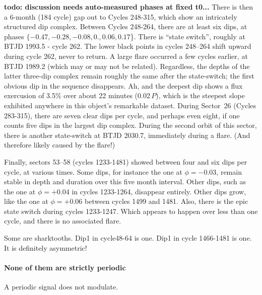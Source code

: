 \documentclass[11pt,twocolumn,tighten]{aastex63}
\begin{document}
{\bf todo: discussion needs auto-measured phases at fixed t0...}
There is then a 6-month (184 cycle) gap out to Cycles 248-315, which
show an intricately structured dip complex.
Between Cycles 248-264, there are at least six dips, at phases $\{
  -0.47, -0.28, -0.08,  0.  ,  0.06,  0.17 $\}.
There is ``state switch'', roughly at BTJD 1993.5 - cycle 262.
The lower black points in cycles 248--264 shift upward during cycle
262, never to return.
A large flare occurred a few cycles earlier, at BTJD 1989.2 (which may
or may not be related).
Regardless, the depths of the latter three-dip complex remain roughly
the same after the state-switch;
the first obvious dip in the sequence disappears.
Ah, and the deepest dip shows a flux exercusion of 3.5\% over about 22 minutes (0.02\,$P$),
which is the steepest slope exhibited anywhere in this object's
remarkable dataset.
During Sector~26 (Cycles 283-315), there are seven clear dips per
cycle, and perhaps even eight, if one counts five dips in the largest
dip complex.
During the second orbit of this sector,
there is another state-switch at BTJD 2030.7, immediately during a
flare.   (And therefore likely caused by the flare!)

Finally, sectors 53--58 (cycles 1233-1481) showed between four and six
dips per cycle, at various times.  
Some dips, for instance the one at $\phi = -0.03$, remain stable in
depth and duration over this five month interval.
Other dips, such as the one at $\phi = +0.04$ in cycles 1233-1264,
disappear entirely.
Other dips grow, like the one at $\phi = +0.06$ between cycles 1499
and 1481.
Also, there is the epic state switch during cycles 1233-1247.
Which appears to happen over less than one cycle, and there is no
associated flare.

Some are sharktooths.
Dip1 in cycle48-64 is one.
Dip1 in cycle 1466-1481 is one.
It is definitely asymmetric!





\paragraph{None of them are strictly periodic}

A periodic signal does not modulate.
\end{document}
